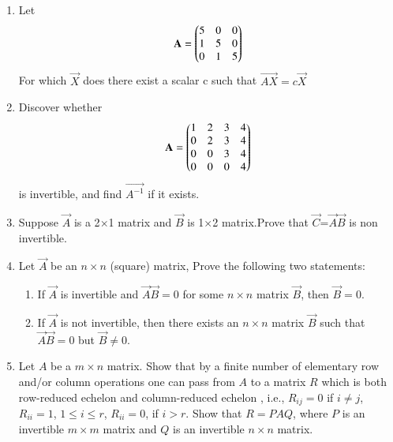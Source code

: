 \renewcommand{\theequation}{\theenumi}
\renewcommand{\thefigure}{\theenumi}
\begin{enumerate}[label=\thesubsection.\arabic*.,ref=\thesubsection.\theenumi]
%
\item Let 
\begin{align}
	\mathbf{A} = \begin{pmatrix}5 & 0 & 0\\1 & 5 & 0\\0 & 1 & 5\end{pmatrix}
\end{align}
For which $\vec{X}$ does there exist a scalar c such that $\vec{AX} = c \vec{X}$
%
\\
%
\solution

\item Discover whether
\begin{align}
	\mathbf{A}=\begin{pmatrix} 1 & 2 & 3 & 4 \\
			0 & 2 & 3 & 4 \\
			0 & 0 & 3 & 4 \\
			0 & 0 & 0 & 4\end{pmatrix}
\end{align}
is invertible, and find $\vec{A^{-1}}$ if it exists.
\\
%
\solution

%
\item Suppose $\vec{A}$ is a 2$\times$1  matrix and $\vec{B}$ is 1$\times$2 matrix.Prove that $\vec{C}$=$\vec{A}$$\vec{B}$ is non invertible.

\solution

\item Let $\vec{A}$ be an $n \times n$ (square) matrix, Prove the following two statements:
 \begin{enumerate}
   \item If $\vec{A}$ is invertible and $\vec{A}\vec{B}=0$ for some $n \times n$ matrix $\vec{B}$, then $\vec{B}=0$.
   \item If $\vec{A}$ is not invertible, then there exists an $n \times n$ matrix $\vec{B}$ such that $\vec{A}\vec{B}=0$ but $\vec{B} \not= 0$.
 \end{enumerate}
%
\solution

\item Let $A$ be a $m\times n$ matrix. Show that by a finite number of elementary row and/or column operations one can pass from $A$ to a matrix $R$ which is both row-reduced echelon and column-reduced echelon , i.e., $R_{ij}=0$ if $i\neq j$, $R_{ii}=1$, $1\leq i\leq r$, $R_{ii}=0$, if $i>r$. Show that $R = PAQ$, where $P$ is an invertible $m\times m$ matrix and $Q$ is an invertible $n\times n$ matrix.
\\
\solution

\end{enumerate}


